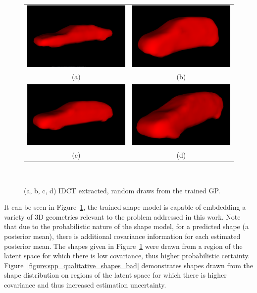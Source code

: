 \begin{figure}[!htbp]
  \centering
  \begin{tabular}{cc}
    \includegraphics[width=.4\linewidth]{figures/spp/gp_draws/0.png}&
		\includegraphics[width=.4\linewidth]{figures/spp/gp_draws/1.png}\\
    (a) & (b) \\
    \includegraphics[width=.4\linewidth]{figures/spp/gp_draws/2.png}&
		\includegraphics[width=.4\linewidth]{figures/spp/gp_draws/3.png}\\
    (c) & (d)
  \end{tabular}
  \caption[GP Shape Draws]
  {
    (a, b, c, d) IDCT extracted, random draws from the trained GP.
  }
~\label{figure:spp_qualitative_shapes}
\end{figure}

It can be seen in Figure~\ref{figure:spp_qualitative_shapes}, the trained shape model is capable of embdedding a variety of 
3D geometries relevant to the problem addressed in this work. Note that due to the probabilistic nature of the shape model, for 
a predicted shape (a posterior mean), there is additional covariance information for each estimated posterior mean. The shapes 
given in Figure~\ref{figure:spp_qualitative_shapes} were drawn from a region of the latent space for which there is low covariance, 
thus higher probabilistic certainty. Figure~\ref{figure:spp_qualitative_shapes_bad} demonstrates shapes drawn from the shape distribution 
on regions of the latent space for which there is higher covariance and thus increased estimation uncertainty.

